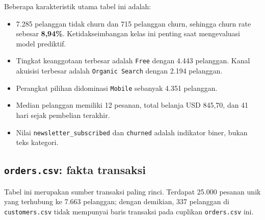 \documentclass[
  indonesian,
  letterpaper,
  DIV=11,
  numbers=noendperiod]{scrreprt}
\providecommand{\tightlist}{%
  \setlength{\itemsep}{0pt}\setlength{\parskip}{0pt}}
\begin{document}
Beberapa karakteristik utama tabel ini adalah:

\begin{itemize}
\tightlist
\item
  7.285 pelanggan tidak churn dan 715 pelanggan churn, sehingga churn
  rate sebesar \textbf{8,94\%}. Ketidakseimbangan kelas ini penting saat
  mengevaluasi model prediktif.
\item
  Tingkat keanggotaan terbesar adalah \texttt{Free} dengan 4.443
  pelanggan. Kanal akuisisi terbesar adalah \texttt{Organic\ Search}
  dengan 2.194 pelanggan.
\item
  Perangkat pilihan didominasi \texttt{Mobile} sebanyak 4.351 pelanggan.
\item
  Median pelanggan memiliki 12 pesanan, total belanja USD 845,70, dan 41
  hari sejak pembelian terakhir.
\item
  Nilai \texttt{newsletter\_subscribed} dan \texttt{churned} adalah
  indikator biner, bukan teks kategori.
\end{itemize}

\subsection*{\texorpdfstring{\texttt{orders.csv}: fakta
transaksi}{orders.csv: fakta transaksi}}\label{orders.csv-fakta-transaksi}

Tabel ini merupakan sumber transaksi paling rinci. Terdapat 25.000
pesanan unik yang terhubung ke 7.663 pelanggan; dengan demikian, 337
pelanggan di \texttt{customers.csv} tidak mempunyai baris transaksi pada
cuplikan \texttt{orders.csv} ini.
\end{document}
